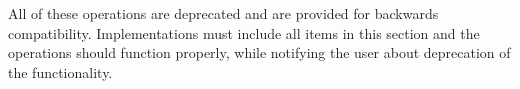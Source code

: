 All of these operations are deprecated and are provided for backwards
compatibility. 
Implementations must include all items in this section
and the operations should function properly, while notifying the user
about deprecation of the functionality.

